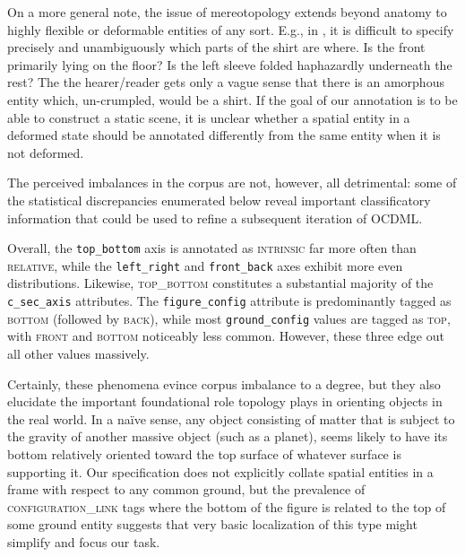 \documentclass[11pt]{article}
\begin{document}

On a more general note, the issue of mereotopology extends beyond anatomy to highly flexible or deformable entities of any sort. E.g., in , it is difficult to specify precisely and unambiguously which parts of the shirt are where. Is the front primarily lying on the floor? Is the left sleeve folded haphazardly underneath the rest? The the hearer/reader gets only a vague sense that there is an amorphous entity which, un-crumpled, would be a shirt. If the goal of our annotation is to be able to construct a static scene, it is unclear whether a spatial entity in a deformed state should be annotated differently from the same entity when it is not deformed.

The perceived imbalances in the corpus are not, however, all detrimental: some of the statistical discrepancies enumerated below reveal important classificatory information that could be used to refine a subsequent iteration of OCDML.

Overall, the \texttt{top\_bottom} axis is annotated as \textsc{intrinsic} far more often than \textsc{relative}, while the \texttt{left\_right} and \texttt{front\_back} axes exhibit more even distributions. Likewise, \textsc{top\_bottom} constitutes a substantial majority of the \texttt{c\_sec\_axis} attributes. The \texttt{figure\_config} attribute is predominantly tagged as \textsc{bottom} (followed by \textsc{back}), while most \texttt{ground\_config} values are tagged as \textsc{top}, with \textsc{front} and \textsc{bottom} noticeably less common. However, these three edge out all other values massively.

Certainly, these phenomena evince corpus imbalance to a degree, but they also elucidate the important foundational role topology plays in orienting objects in the real world. In a naïve sense, any object consisting of matter that is subject to the gravity of another massive object (such as a planet), seems likely to have its bottom relatively oriented toward the top surface of whatever surface is supporting it. Our specification does not explicitly collate spatial entities in a frame with respect to any common ground, but the prevalence of \textsc{configuration\_link} tags where the bottom of the figure is related to the top of some ground entity suggests that very basic localization of this type might simplify and focus our task.
 
\end{document}
